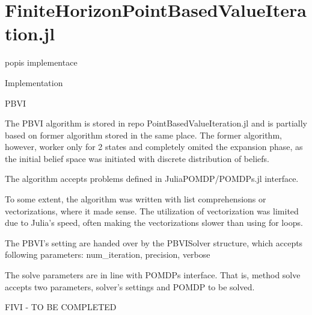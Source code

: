 \section{FiniteHorizonPointBasedValueIteration.jl}
popis implementace







Implementation

PBVI

The PBVI algorithm is stored in repo PointBasedValueIteration.jl and is partially based on former algorithm stored in the same place. The former algorithm, however, worker only for 2 states and completely omited the expansion phase, as the initial belief space was initiated with discrete distribution of beliefs.


The algorithm accepts problems defined in JuliaPOMDP/POMDPs.jl interface.



To some extent, the algorithm was written with list comprehensions or vectorizations, where it made sense. The utilization of vectorization was limited due to Julia's speed, often making the vectorizations slower than using for loops.



The PBVI's setting are handed over by the PBVISolver structure, which accepts following parameters:
num\_iteration, precision, verbose

The solve parameters are in line with POMDPs interface. That is, method solve accepts two parameters, solver's settings and POMDP to be solved. 


FIVI - TO BE COMPLETED 

















